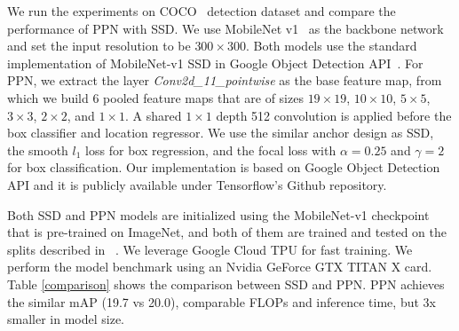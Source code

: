 \documentclass[10pt,twocolumn,letterpaper]{article}
\newcommand{\todo}[1]{\textcolor{red}{[Todo: #1]}}
\begin{document}
We run the experiments on COCO~\cite{lin2014coco} detection dataset
and compare the performance of PPN with SSD.
We use MobileNet v1~\cite{howard2017mobilenet} as the backbone network
and set the input resolution to be $300\times 300$.
Both models use the standard implementation of MobileNet-v1 SSD in
Google Object Detection API~\cite{huang2017gmi}.
For PPN,
we extract the layer \textit{Conv2d\_11\_pointwise} as the base feature map,
from which we build 6 pooled feature maps that are of sizes
$19\times 19$,
$10\times 10$,
$5\times 5$,
$3\times 3$,
$2\times 2$, and
$1\times 1$.
A shared $1\times 1$ depth 512 convolution is applied before the box classifier and location regressor.
We use the similar anchor design as SSD,
the smooth $l_{1}$ loss for box regression,
and the focal loss with $\alpha=0.25$ and $\gamma=2$ for box classification.
Our implementation is based on Google Object Detection API
and it is publicly available under Tensorflow's Github repository.

Both SSD and PPN models are initialized using the MobileNet-v1 checkpoint
that is pre-trained on ImageNet, and
both of them are trained and tested on the splits described in
~\cite{huang2017gmi}.
We leverage Google Cloud TPU for fast training.
We perform the model benchmark using an Nvidia GeForce GTX TITAN X card.
Table \ref{comparison} shows the comparison between SSD and PPN.
PPN achieves the similar mAP (19.7 vs 20.0),
comparable FLOPs and inference time,
but 3x smaller in model size.



{\small


}
\end{document}
